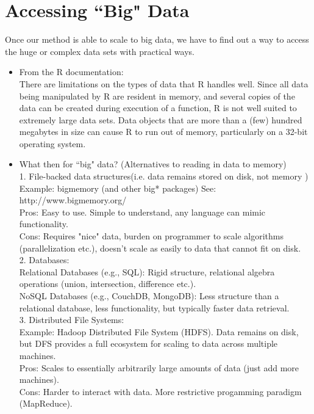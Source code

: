 \documentclass[article]{memoir}
\DeclareMathOperator{\1}{\mathbf{1}}
\theoremstyle{definition}
\begin{document}
\section{Accessing ``Big" Data}
Once our method is able to scale to big data, we have to find out a way to access the huge or complex data sets with practical ways.
\begin{itemize}
\item From the R documentation:\\
There are limitations on the types of data that R handles well. Since all data being manipulated by R are resident in memory, and several copies of the data can be created during execution of a function, R is not well suited to extremely large data sets. Data objects that are more than a (few) hundred megabytes in size can cause R to run out of memory, particularly on a 32-bit operating system.

\item What then for ``big" data? (Alternatives to reading in data to memory)\\
1. File-backed data structures(i.e. data remains stored on disk, not memory )
Example: bigmemory (and other big* packages) See: http://www.bigmemory.org/ \\
Pros: Easy to use. Simple to understand, any language can mimic functionality.\\
Cons: Requires "nice" data, burden on programmer to scale algorithms (parallelization etc.), doesn't scale as easily to data that cannot fit on disk.\\

2. Databases:\\
Relational Databases (e.g., SQL): Rigid structure, relational algebra operations (union, intersection, difference etc.).\\
NoSQL Databases (e.g., CouchDB, MongoDB): Less structure than a relational database, less functionality, but typically faster data retrieval.\\

3. Distributed File Systems:\\
Example: Hadoop Distributed File System (HDFS). Data remains on disk, but DFS provides a full ecosystem for scaling to data across multiple machines.\\
Pros: Scales to essentially arbitrarily large amounts of data (just add more machines).\\
Cons: Harder to interact with data. More restrictive progamming paradigm (MapReduce).
\end{itemize}
\end{document}

